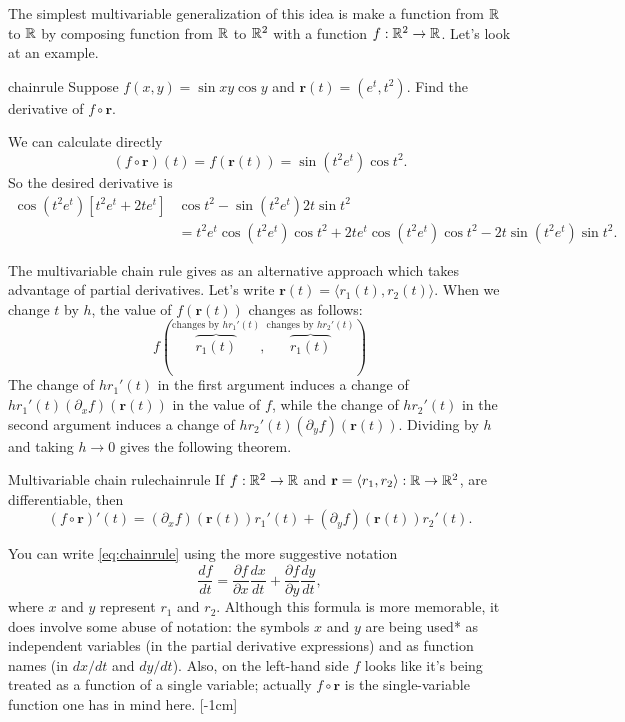 \documentclass[svgnames]{report}
\begin{document}
  The simplest multivariable generalization of this idea is make a
  function from $\mathbb{R}$ to $\mathbb{R}$ by composing function from $\mathbb{R}$ to $\mathbb{R}^2$
  with a function $f: \mathbb{R}^2 \to \mathbb{R}$. Let's look at an example.

  \begin{example}{}{chainrule}
    Suppose $f(x,y) = \sin xy \cos y$ and $\mathbf{r}(t) = (e^t,
    t^2)$. Find the derivative of $f \circ \mathbf{r}$. 
  \end{example}

  \begin{solution}
    We can calculate directly
    \[
      (f \circ \mathbf{r})(t) = f(\mathbf{r}(t)) = \sin (t^2e^t) \cos
      t^2. 
    \]
    So the desired derivative is
    \begin{align*}
      \cos(t^2e^t)\left[ t^2 e^t + 2te^t\right] &\cos t^2  -
      \sin(t^2 e^t) 2t \sin t^2  \\ &=
      t^2 e^t \cos(t^2 e^t) \cos t^2 + 2te^t \cos(t^2 e^t) \cos t^2 -
      2t\sin(t^2 e^t) \sin t^2. 
    \end{align*}
  \end{solution}

  The multivariable chain rule gives as an alternative approach which
  takes advantage of partial derivatives. Let's write
  $\mathbf{r}(t) = \langle r_1(t), r_2(t) \rangle$.  When we change
  $t$ by $h$, the value of $f(\mathbf{r}(t))$ changes as follows: 
  \[
    f\left(
      \overbrace{r_1(t)}^{\text{changes by $hr_1'(t)$}},
      \overbrace{r_1(t)}^{\text{changes by $hr_2'(t)$}}
    \right)
  \]
  The change of $hr_1'(t)$ in the first argument induces a change of
  $hr_1'(t) (\partial_xf)(\mathbf{r}(t))$ in the value of $f$, while
  the change of $hr_2'(t)$ in the second argument induces a change of
  $hr_2'(t) (\partial_yf)(\mathbf{r}(t))$. Dividing by $h$ and taking
  $h \to 0$ gives the following theorem. 
  
  \begin{theo}{Multivariable chain rule}{chainrule}
    If $f : \mathbb{R}^2 \to \mathbb{R}$ and $\mathbf{r} = \langle r_1,  r_2\rangle :
    \mathbb{R} \to \mathbb{R}^2$,
    are differentiable, then
    \begin{equation} \label{eq:chainrule} 
      (f\circ \mathbf{r})'(t) = (\partial_x f)(\mathbf{r}(t))r_1'(t) +
      (\partial_y f)(\mathbf{r}(t))r_2'(t). 
    \end{equation}
  \end{theo}

  You can write \eqref{eq:chainrule} using the more suggestive
  notation
  \[
    \frac{df}{dt} = \frac{\partial f}{\partial x}\frac{dx}{dt} +
    \frac{\partial f}{\partial y}\frac{dy}{dt}, 
  \]
  where $x$ and $y$ represent $r_1$ and $r_2$. Although this formula
  is more memorable, it does involve some abuse of notation: the
  symbols $x$ and $y$ are being used* as independent variables (in the
  partial derivative expressions) and as function names (in $dx/dt$
  and $dy/dt$). Also, on the left-hand side $f$ looks like it's being
  treated as a function of a single variable; actually
  $f\circ \mathbf{r}$ is the single-variable function one has in mind here.
  [-1cm]
\end{document}
